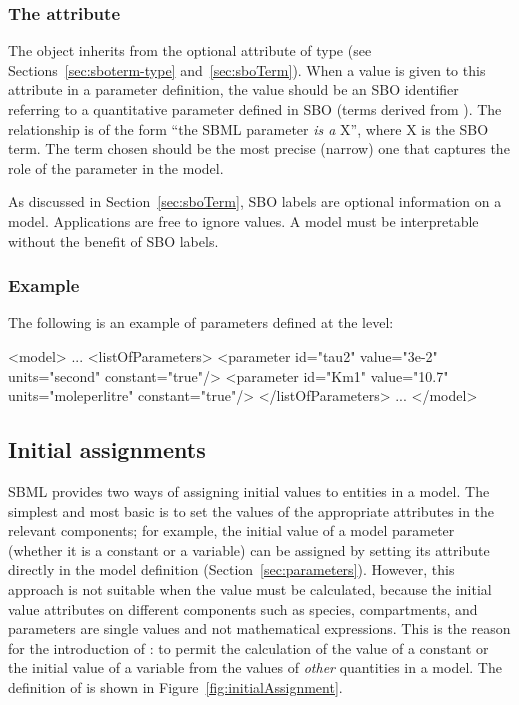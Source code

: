 \subsubsection{The  attribute}
\label{sec:parameter-sboterm}

The \Parameter object inherits from \SBase the optional  attribute of
type  (see Sections~\ref{sec:sboterm-type}
and~\ref{sec:sboTerm}).  When a value is given to this attribute in a
parameter definition, the value should be an SBO identifier
referring to a quantitative parameter defined in SBO (\ie terms
derived from \sboparameter).  The relationship is of the form
``the SBML parameter \emph{is a} X'', where X is the SBO term.
The term chosen should be the most precise (narrow) one that
captures the role of the parameter in the model.

As discussed in Section~\ref{sec:sboTerm}, SBO labels are optional
information on a model.  Applications are free to ignore
 values.  A model must be interpretable without the
benefit of SBO labels.


\subsubsection{Example}

The following is an example of parameters defined at the \Model level:

\begin{example}
<model>
    ...
    <listOfParameters>
        <parameter id="tau2" value="3e-2" units="second" constant="true"/>
        <parameter id="Km1" value="10.7" units="moleperlitre" constant="true"/>
    </listOfParameters>
    ...
</model>
\end{example}
\vspace*{-1ex}


\subsection{Initial assignments}
\label{sec:initialAssignment}

SBML \thisLV provides two ways of assigning initial values to
entities in a model.  The simplest and most basic is to set the
values of the appropriate attributes in the relevant
components; for example, the initial value of a model parameter
(whether it is a constant or a variable) can be assigned by
setting its  attribute directly in the model definition
(Section~\ref{sec:parameters}).  However, this approach is not
suitable when the value must be calculated, because the initial
value attributes on different components such as species,
compartments, and parameters are single values and not
mathematical expressions.  This is the reason for the introduction
of \InitialAssignment: to permit the calculation of the value of a
constant or the initial value of a variable from the values of
\emph{other} quantities in a model.  The definition of
\InitialAssignment is shown in Figure~\vref{fig:initialAssignment}.

